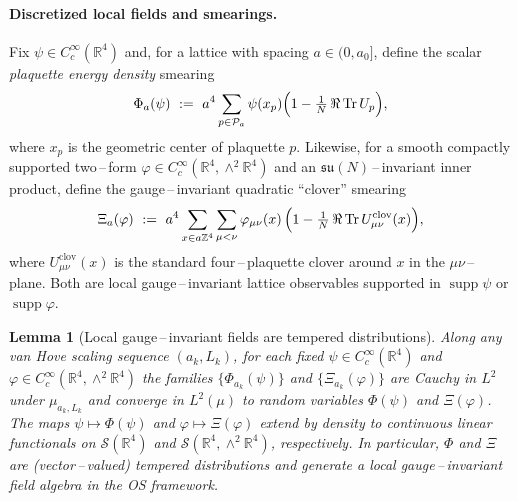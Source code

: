 \documentclass[11pt]{amsart}
\theoremstyle{plain}
\newtheorem{lemma}[theorem]{Lemma}
\theoremstyle{definition}
\theoremstyle{remark}
\begin{document}
\paragraph{Discretized local fields and smearings.}
Fix $\psi\in C_c^\infty(\mathbb R^4)$ and, for a lattice with spacing $a\in(0,a_0]$, define the scalar \emph{plaquette energy density} smearing
\[
  \Phi_a(\psi)\ :=\ a^4\sum_{p\in\mathcal P_a} \psi(x_p)\Bigl(1-\tfrac1N\,\Re\,\mathrm{Tr}\,U_p\Bigr),
\]
where $x_p$ is the geometric center of plaquette $p$. Likewise, for a smooth compactly supported two\,–\,form $\varphi\in C_c^\infty(\mathbb R^4,\wedge^2\mathbb R^4)$ and an $\mathfrak{su}(N)$\,–\,invariant inner product, define the gauge\,–\,invariant quadratic ``clover'' smearing
\[
  \Xi_a(\varphi)\ :=\ a^4\sum_{x\in a\mathbb Z^4} \sum_{\mu<\nu} \varphi_{\mu\nu}(x)\,\Bigl(1-\tfrac1N\,\Re\,\mathrm{Tr}\,U^{\text{clov}}_{\mu\nu}(x)\Bigr),
\]
where $U^{\text{clov}}_{\mu\nu}(x)$ is the standard four\,–\,plaquette clover around $x$ in the $\mu\nu$\,–\,plane. Both are local gauge\,–\,invariant lattice observables supported in $\operatorname{supp}\psi$ or $\operatorname{supp}\varphi$.

\begin{lemma}[Local gauge\,–\,invariant fields are tempered distributions]
\label{lem:local-fields-tempered}
Along any van Hove scaling sequence $(a_k,L_k)$, for each fixed $\psi\in C_c^\infty(\mathbb R^4)$ and $\varphi\in C_c^\infty(\mathbb R^4,\wedge^2\mathbb R^4)$ the families $\{\Phi_{a_k}(\psi)\}$ and $\{\Xi_{a_k}(\varphi)\}$ are Cauchy in $L^2$ under $\mu_{a_k,L_k}$ and converge in $L^2(\mu)$ to random variables $\Phi(\psi)$ and $\Xi(\varphi)$. The maps $\psi\mapsto\Phi(\psi)$ and $\varphi\mapsto\Xi(\varphi)$ extend by density to continuous linear functionals on $\mathcal S(\mathbb R^4)$ and $\mathcal S(\mathbb R^4,\wedge^2\mathbb R^4)$, respectively. In particular, $\Phi$ and $\Xi$ are (vector\,–\,valued) tempered distributions and generate a local gauge\,–\,invariant field algebra in the OS framework.
\end{lemma}
\end{document}
